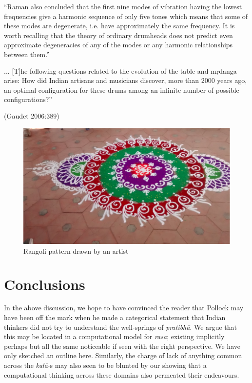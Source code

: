 \begin{myquote}
“Raman also concluded that the first nine modes of vibration having the lowest frequencies give a harmonic sequence of only five tones which means that some of these modes are degenerate, i.e. have approximately the same frequency. It is worth recalling that the theory of ordinary drumheads does not predict even approximate degeneracies of any of the modes or any harmonic relationships between them.” 

... [T]he following questions related to the evolution of the table and mṛdanga arise: How did Indian artisans and musicians discover, more than 2000 years ago, an optimal configuration for these drums among an infinite number of possible configurations?” 

\hfill (Gaudet 2006:389)
\end{myquote}
\begin{figure}[H]
\centering
\includegraphics[scale=.8]{figures/8.eps}
\caption{Rangoli pattern drawn by an artist}\label{chap3-fig6}
\end{figure}

\section{Conclusions}\label{chap3-sec6}

In the above discussion, we hope to have convinced the reader that Pollock may have been off the mark when he made a categorical statement that Indian thinkers did not try to understand the well-springs of \textsl{pratibhā}. We argue that this may be located in a computational model for \textsl{rasa}; existing implicitly perhaps but all the same noticeable if seen with the right perspective. We have only sketched an outline here. Similarly, the charge of lack of anything common across the \textsl{kalā}-s may also seen to be blunted by our showing that a computational thinking across these domains also permeated their endeavours.

